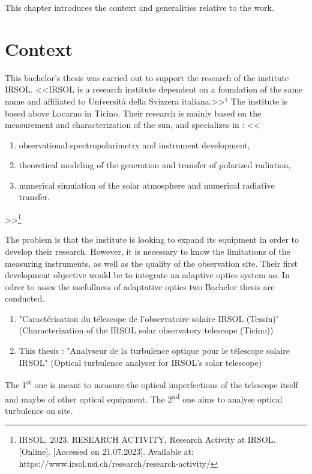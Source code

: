 This chapter introduces the context and generalities relative to the work.

\section{Context}
This bachelor's thesis was carried out to support the research of the institute \Gls{IRSOL}. \newline
<<\Gls{IRSOL} is a research institute dependent on a foundation of the same name and affiliated to Università della Svizzera italiana.>>$^1$
The institute is based above Locarno in Ticino. \newline
Their research is mainly based on the measurement and characterization of the sun, and specializes in :
<<
\begin{enumerate}
    \item observational spectropolarimetry and instrument development,
    \item theoretical modeling of the generation and transfer of polarized radiation,
    \item numerical simulation of the solar atmosphere and numerical radiative transfer.
\end{enumerate}>>\footnote{\cite{IRSOL_research} IRSOL, 2023. RESEARCH ACTIVITY, Research Activity at IRSOL. [Online]. [Accessed on 21.07.2023]. Available at: https://www.irsol.usi.ch/research/research-activity/}

The problem is that the institute is looking to expand its equipment in order to develop their research.
However, it is necessary to know the limitations of the measuring instruments, as well as the quality of the observation site.
Their first development objective would be to integrate an adaptive optics system \acrfull{ao}.
\newline
In odrer to asses the usefullness of adaptative optics two Bachelor thesis are conducted.
\begin{enumerate}
    \item "Caractérisation du télescope de l'observatoire solaire \Gls{IRSOL} (Tessin)" (Characterization of the \Gls{IRSOL} solar observatory telescope (Ticino))
    \item This thesis : "Analyseur de la turbulence optique pour le télescope solaire \Gls{IRSOL}" (Optical turbulence analyser for \Gls{IRSOL}'s solar telescope)
\end{enumerate}
The 1\textsuperscript{st} one is meant to measure the optical imperfections of the telescope itself and maybe of other optical equipment.
The 2\textsuperscript{nd} one aims to analyse optical turbulence on site.

